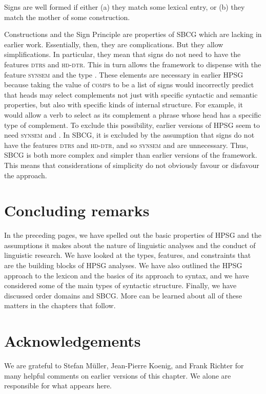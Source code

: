 \documentclass[output=paper
	        ,collection
	        ,collectionchapter
 	        ,biblatex
                ,babelshorthands
                ,newtxmath
                ,draftmode
                ,colorlinks, citecolor=brown
]{langscibook}
\begin{document}
\ea\label{ex:prop49}
Signs are well formed if either (a) they match some lexical entry, or (b) they match the mother of some construction.
\z

\noindent
Constructions and the Sign Principle are properties of SBCG which are lacking in earlier
work. Essentially, then, they are complications. But they allow simplifications. In particular, they
mean that signs do not need to have the features \textsc{dtrs} and \textsc{hd-dtr}. This in turn
allows the framework to dispense with the feature \textsc{synsem} and the type . These
elements are necessary in earlier HPSG because taking the value of \textsc{comps} to be a list of
signs would incorrectly predict that heads may select complements not just with specific syntactic
and semantic properties, but also with specific kinds of internal structure. For example, it would
allow a verb to select as its complement a phrase whose head has a specific type of complement. To
exclude this possibility, earlier versions of HPSG seem to need \textsc{synsem} and 
\citep[]{ps2}. In SBCG, it is excluded by the assumption that signs do not have the features
\textsc{dtrs} and \textsc{hd-dtr}, and so \textsc{synsem} and  are unnecessary. Thus,
SBCG is both more complex and simpler than earlier versions of the framework. This means that
considerations of simplicity do not obviously favour or disfavour the approach. 

\section{Concluding remarks}\label{sec:prop8}

In the preceding pages, we have spelled out the basic properties of HPSG and the assumptions it makes about the nature of linguistic analyses and the conduct of linguistic research. We have looked at the types, features, and constraints that are the building blocks of HPSG analyses. We have also outlined the HPSG approach to the lexicon and the basics of its approach to syntax, and we have considered some of the main types of syntactic structure. Finally, we have discussed order domains and SBCG. More can be learned about all of these matters in the chapters that follow.


\section*{Acknowledgements}

We are grateful to Stefan Müller, Jean-Pierre Koenig, and Frank Richter for many helpful comments on
earlier versions of this chapter. We alone are responsible for what appears here.



{\sloppy
\printbibliography[heading=subbibliography,notkeyword=this]
}
\end{document}
